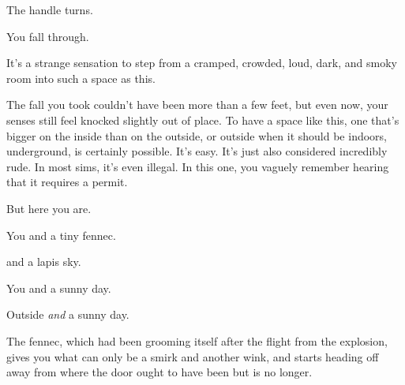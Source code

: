 \newpage

\null
\vfill

The handle turns.

\vfill
\newpage

\null
\vfill

You fall through.

\vfill

\newpage

\null
\vfill

It's a strange sensation to step from a cramped, crowded, loud, dark, and smoky room into such a space as this.

The fall you took couldn't have been more than a few feet, but even now, your senses still feel knocked slightly out of place. To have a space like this, one that's bigger on the inside than on the outside, or outside when it should be indoors, underground, is certainly possible. It's easy. It's just also considered incredibly rude. In most sims, it's even illegal. In this one, you vaguely remember hearing that it requires a permit.

But here you are.

\vfill

\newpage
\null
\vfill

You and a tiny fennec.

\phantom{You} {\footnotesize and a lapis sky.}

\phantom{You and}{\tiny endless green fields.}

\vfill

\begin{comment}
\null
\vfill

You and a tiny fennec.

\null
\vfill

\newpage

\null
\vfill

You and a lapis sky.

\null
\vfill

\newpage

\null
\vfill

You and endless green fields.

\null
\vfill
\end{comment}

\newpage

You and a sunny day.

Outside \emph{and} a sunny day.

The fennec, which had been grooming itself after the flight from the explosion, gives you what can only be a smirk and another wink, and starts heading off away from where the door ought to have been but is no longer.

